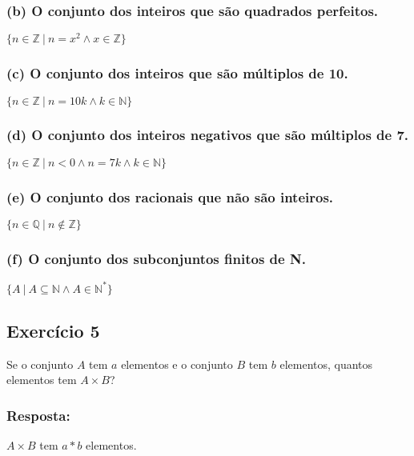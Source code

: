 \documentclass{article}
\begin{document}
\subsubsection*{(b) O conjunto dos inteiros que são quadrados perfeitos.}
$\{n \in \mathbb{Z} \ | \ n = x^2 \wedge x \in \mathbb{Z}\}$

\subsubsection*{(c) O conjunto dos inteiros que são múltiplos de 10.}
$\{n \in \mathbb{Z} \ | \ n = 10k \wedge k \in \mathbb{N}\}$

\subsubsection*{(d) O conjunto dos inteiros negativos que são múltiplos de 7.}
$\{n \in \mathbb{Z} \ | \ n < 0 \wedge n=7k \wedge k \in \mathbb{N}\}$

\subsubsection*{(e) O conjunto dos racionais que não são inteiros.}
$\{n \in \mathbb{Q} \ | \ n \notin \mathbb{Z}\}$

\subsubsection*{(f) O conjunto dos subconjuntos finitos de N.}
$\{A \ | \ A \subseteq \mathbb{N} \wedge A \in \mathbb{N}^*\}$

\subsection*{Exercício 5}
Se o conjunto $A$ tem $a$ elementos e o conjunto $B$ tem $b$ elementos, quantos elementos tem $A \times B$?

\subsubsection*{Resposta:}
$A \times B$ tem $a * b$ elementos.
\end{document}
